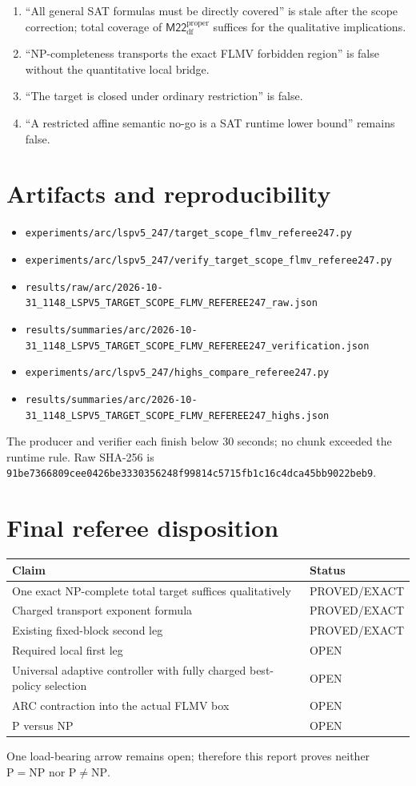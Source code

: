 \documentclass[11pt]{article}
\newcommand{\M}{\mathsf{M22}^{\mathrm{proper}}_{\mathrm{df}}}
\begin{document}
\begin{enumerate}
\item ``All general SAT formulas must be directly covered'' is stale after the scope
correction; total coverage of $\M$ suffices for the qualitative implications.
\item ``NP-completeness transports the exact FLMV forbidden region'' is false without
the quantitative local bridge.
\item ``The target is closed under ordinary restriction'' is false.
\item ``A restricted affine semantic no-go is a SAT runtime lower bound'' remains false.
\end{enumerate}

\section{Artifacts and reproducibility}

\begin{itemize}
\item \texttt{experiments/arc/lspv5\_247/target\_scope\_flmv\_referee247.py}
\item \texttt{experiments/arc/lspv5\_247/verify\_target\_scope\_flmv\_referee247.py}
\item \texttt{results/raw/arc/2026-10-31\_1148\_LSPV5\_TARGET\_SCOPE\_FLMV\_REFEREE247\_raw.json}
\item \texttt{results/summaries/arc/2026-10-31\_1148\_LSPV5\_TARGET\_SCOPE\_FLMV\_REFEREE247\_verification.json}
\item \texttt{experiments/arc/lspv5\_247/highs\_compare\_referee247.py}
\item \texttt{results/summaries/arc/2026-10-31\_1148\_LSPV5\_TARGET\_SCOPE\_FLMV\_REFEREE247\_highs.json}
\end{itemize}

The producer and verifier each finish below 30 seconds; no chunk exceeded the runtime
rule.  Raw SHA-256 is
\texttt{91be7366809cee0426be3330356248f99814c5715fb1c16c4dca45bb9022beb9}.

\section{Final referee disposition}

\begin{center}
\begin{tabular}{ll}
\toprule
Claim & Status \\
\midrule
One exact NP-complete total target suffices qualitatively & PROVED/EXACT \\
Charged transport exponent formula & PROVED/EXACT \\
Existing fixed-block second leg & PROVED/EXACT \\
Required local first leg & OPEN \\
Universal adaptive controller with fully charged best-policy selection & OPEN \\
ARC contraction into the actual FLMV box & OPEN \\
P versus NP & OPEN \\
\bottomrule
\end{tabular}
\end{center}

One load-bearing arrow remains open; therefore this report proves neither
$\mathrm P=\mathrm{NP}$ nor $\mathrm P\ne\mathrm{NP}$.

\end{document}
